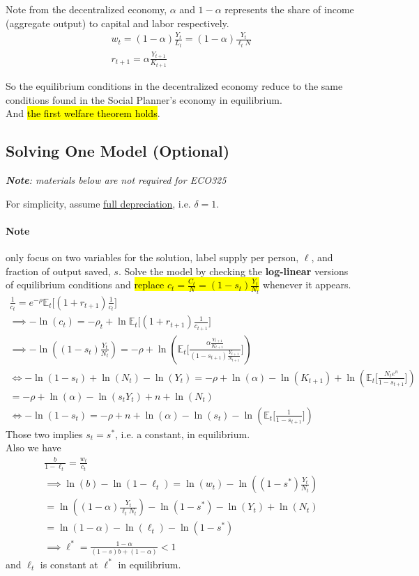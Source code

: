 \documentclass[11pt]{article}
\newcommand{\expat}[2]{\mathbb{E}_{#1}\Big[{#2}\Big]}
\begin{document}
			\par Note from the decentralized economy, $\alpha$ and $1 - \alpha$ represents the share of income (aggregate output) to capital and labor respectively.
			\begin{gather*}
				w_t = (1-\alpha)\frac{Y_t}{L_t} = (1-\alpha) \frac{Y_t}{\ell_t N} \\
				r_{t+1} = \alpha \frac{Y_{t+1}}{K_{t+1}}
			\end{gather*}
			\par So the equilibrium conditions  in the decentralized economy reduce to the same conditions found in the Social Planner's economy in equilibrium. \\
			And \hl{the first welfare theorem holds}.
			
		\subsection{Solving One Model (Optional)}
		\emph{\textbf{Note}: materials below are not required for ECO325}
		\begin{assumption}
			For simplicity, assume \ul{full depreciation}, i.e. $\delta = 1$.
		\end{assumption}
		\paragraph{Note} only focus on two variables for the solution, label supply per person, $\ell$, and fraction of output saved, $s$. Solve the model by checking the \textbf{log-linear} versions of equilibrium conditions and \hl{replace $c_t = \frac{C_t}{N} = (1-s_t)\frac{Y_t}{N_t}$} whenever it appears.
		\begin{gather*}
			\frac{1}{c_t} = e^{-\rho} \expat{t}{(1+r_{t+1})\frac{1}{c_t}} \\
			\implies -\ln(c_t) = - \rho_t + \ln \expat{t}{(1+r_{t+1})\frac{1}{c_{t+1}}} \\
			\implies - \ln((1-s_t)\frac{Y_t}{N_t}) = -\rho + \ln(\expat{t}{\frac{\alpha \frac{Y_{t+1}}{K_{t+1}}}{(1-s_{t+1})\frac{Y_{t+1}}{N_{t+1}}}}) \\
			\iff -\ln(1-s_t) + \ln(N_t) - \ln(Y_t) = -\rho + \ln(\alpha) - \ln(K_{t+1}) + \ln(\expat{t}{\frac{N_t e^n}{1-s_{t+1}}}) \\
			= -\rho + \ln(\alpha) - \ln(s_t Y_t) + n + \ln(N_t) \\
			\iff -\ln(1-s_t) = -\rho + n + \ln(\alpha) - \ln(s_t) - \ln(\expat{t}{\frac{1}{1-s_{t+1}}})
		\end{gather*}
		Those two implies $s_t = s^*$, i.e. a constant, in equilibrium. \\
		Also we have 
		\begin{gather*}
			\frac{b}{1-\ell_t} = \frac{w_t}{c_t} \\
			\implies \ln(b) - \ln(1-\ell_t) = \ln(w_t) - \ln((1-s^*)\frac{Y_t}{N_t}) \\
			= \ln((1-\alpha) \frac{Y_t}{\ell_t N_t}) - \ln(1-s^*) - \ln(Y_t) + \ln(N_t) \\
			= \ln(1-\alpha) - \ln(\ell_t) - \ln(1-s^*)\\
			\implies \ell^* = \frac{1-\alpha}{(1-s)b + (1-\alpha)} < 1
		\end{gather*}
		and $\ell_t$ is constant at $\ell^*$ in equilibrium.
\end{document}
